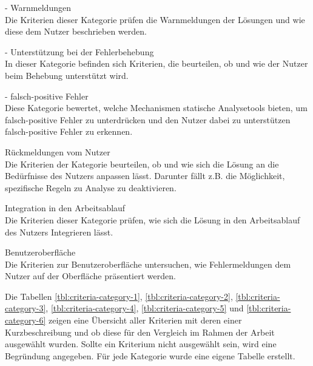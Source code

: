 \begin{description}
    \setlength\itemsep{-0.5cm}
    \item[Kategorie 1]{- Warnmeldungen\\}
          Die Kriterien dieser Kategorie prüfen die Warnmeldungen der Lösungen und wie diese dem Nutzer beschrieben werden.
    \item[Kategorie 2]{- Unterstützung bei der Fehlerbehebung\\}
          In dieser Kategorie befinden sich Kriterien, die beurteilen, ob und wie der Nutzer beim Behebung unterstützt wird.
    \item[Kategorie 3]{- falsch-positive Fehler\\}
          Diese Kategorie bewertet, welche Mechanismen statische Analysetools bieten, um falsch-positive Fehler zu unterdrücken
          und den Nutzer dabei zu unterstützen falsch-positive Fehler zu erkennen.
    \item[Kategorie 4]{Rückmeldungen vom Nutzer\\}
          Die Kriterien der Kategorie beurteilen, ob und wie sich die Lösung an die Bedürfnisse des Nutzers anpassen lässt.
          Darunter fällt z.B. die Möglichkeit, spezifische Regeln zu Analyse zu deaktivieren.
    \item[Kategorie 5]{Integration in den Arbeitsablauf\\}
          Die Kriterien dieser Kategorie prüfen, wie sich die Lösung in den Arbeitsablauf des Nutzers Integrieren lässt.
    \item[Kategorie 6]{Benutzeroberfläche\\}
          Die Kriterien zur Benutzeroberfläche untersuchen, wie Fehlermeldungen dem Nutzer auf der Oberfläche präsentiert werden.
\end{description}

Die Tabellen \ref{tbl:criteria-category-1}, \ref{tbl:criteria-category-2}, \ref{tbl:criteria-category-3}, \ref{tbl:criteria-category-4}, \ref{tbl:criteria-category-5}  und \ref{tbl:criteria-category-6}
zeigen eine Übersicht aller Kriterien mit deren einer Kurzbeschreibung und ob diese für den Vergleich im Rahmen der Arbeit ausgewählt wurden.
Sollte ein Kriterium nicht ausgewählt sein, wird eine Begründung angegeben. Für jede Kategorie wurde eine eigene Tabelle erstellt.

